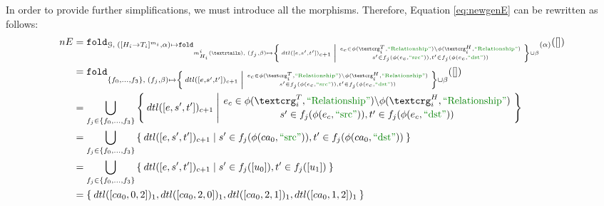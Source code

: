 \begin{example}[continues=ex:firstforgrammars2,label=ex:firstforgrammars3]
In order to provide further simplifications, we must introduce all the morphisms. Therefore, Equation \vref{eq:newgenE} can be rewritten as follows:
\[\begin{split}
nE&=\texttt{fold}_{\mathcal{G},\;([H_i\to T_i]^{m_i},\alpha)\mapsto \texttt{fold}_{m^i_{H_i}(\nested),\;(f_j,\beta)\mapsto \Set{dtl([e,s',t'])_{c+1}|\genfrac{}{}{0pt}{}{e_c\in \phi(\ngraph_i^T,\RELA)\backslash\phi(\ngraph_i^H,\RELA)}{s'\in f_j(\phi(e_c,\SRC)),t'\in f_j(\phi(e_c,\DST))}}\cup\beta }(\alpha)}([])\\
&=\texttt{fold}_{\{f_0,\dots,f_3\},\;(f_j,\beta)\mapsto \Set{dtl([e,s',t'])_{c+1}|\genfrac{}{}{0pt}{}{e_c\in \phi(\ngraph_i^T,\RELA)\backslash\phi(\ngraph_i^H,\RELA)}{s'\in f_j(\phi(e_c,\SRC)),t'\in f_j(\phi(e_c,\DST))}}\cup\beta }([])\\
&=\bigcup_{f_j\in \{f_0,\dots,f_3\}}{ \Set{dtl([e,s',t'])_{c+1}|\genfrac{}{}{0pt}{}{e_c\in \phi(\ngraph_i^T,\RELA)\backslash\phi(\ngraph_i^H,\RELA)}{s'\in f_j(\phi(e_c,\SRC)),t'\in f_j(\phi(e_c,\DST))}} }\\
&=\bigcup_{f_j\in \{f_0,\dots,f_3\}}{ \Set{dtl([e,s',t'])_{c+1}|s'\in f_j(\phi(ca_0,\SRC)),t'\in f_j(\phi(ca_0,\DST))} }\\
&=\bigcup_{f_j\in \{f_0,\dots,f_3\}}{ \Set{dtl([e,s',t'])_{c+1}|s'\in f_j([u_0]),t'\in f_j([u_1])} }\\
&=\Set{dtl([ca_0,0,2])_{1},dtl([ca_0,2,0])_{1},dtl([ca_0,2,1])_{1},dtl([ca_0,1,2])_{1}}
\end{split}\]

\end{example}
